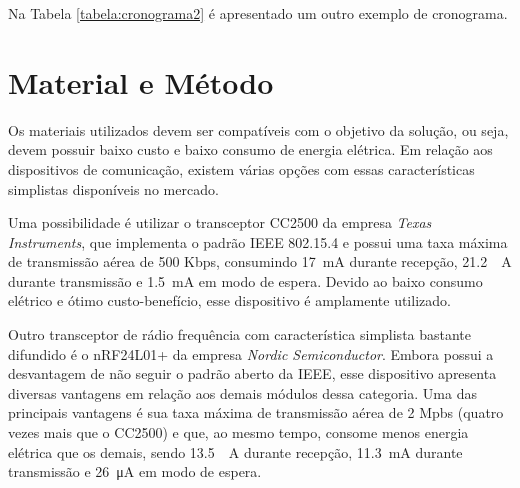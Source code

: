 \documentclass[
    12pt,               %
    a4paper,            %
    english,            %
    brazil,             %
    ]{article}
\begin{document}
 Na Tabela \ref{tabela:cronograma2} é apresentado um outro exemplo de cronograma.



\section{Material e Método}

Os materiais utilizados devem ser compatíveis com o objetivo da solução, ou seja, devem possuir baixo custo e baixo consumo de
energia elétrica. Em relação aos dispositivos de comunicação, existem várias opções com essas características simplistas
disponíveis no mercado.

Uma possibilidade é utilizar o transceptor CC2500 da empresa \textit{Texas Instruments}, que implementa o padrão IEEE 802.15.4 e
possui uma taxa máxima de transmissão aérea de 500 Kbps, consumindo \SI{17}{\milli \ampere} durante recepção, \SI{21.2}{\milli
\ampere} durante transmissão e \SI{1.5}{\milli \ampere} em modo de espera. Devido ao baixo consumo elétrico e ótimo
custo-benefício, esse dispositivo é amplamente utilizado. \cite{ccdatasheet}

Outro transceptor de rádio frequência com característica simplista bastante difundido é o nRF24L01+ da empresa \textit{Nordic
Semiconductor}. Embora possui a desvantagem de não seguir o padrão aberto da IEEE, esse dispositivo apresenta diversas vantagens
em relação aos demais módulos dessa categoria. Uma das principais vantagens é sua taxa máxima de transmissão aérea de 2 Mpbs
(quatro vezes mais que o CC2500) e que, ao mesmo tempo, consome menos energia elétrica que os demais, sendo \SI{13.5}{\milli
\ampere} durante recepção, \SI{11.3}{\milli \ampere} durante transmissão e \SI{26}{\micro \ampere} em modo de espera.
\cite{nrfdatasheet}
\end{document}
